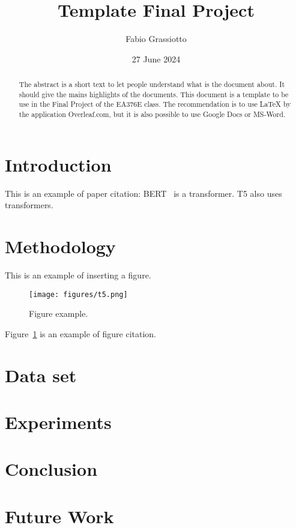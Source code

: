 \documentclass{article}
\title{Template Final Project}
\author{Fabio Grassiotto}
\date{27 June 2024}
\begin{document}
\maketitle

\begin{abstract}
    The abstract is a short text to let people understand what is the document about.
    It should give the mains highlights of the documents.
    This document is a template to be use in the Final Project of the EA376E class.
    The recommendation is to use LaTeX by the application Overleaf.com, but it is also
    possible to use Google Docs or MS-Word.
\end{abstract}

\section{Introduction}

This is an example of paper citation: BERT~ is a transformer. T5 also uses transformers.

\cite{lee2023survey}
\cite{kocmi2023large}
\cite{choi2022curious}
\cite{krause2023commonsense}
\cite{sap2019socialiqa}
\cite{zellers2019recognition}

\section{Methodology} 

This is an example of inserting a figure. 

\begin{figure}[ht]
\centering
\texttt{[image: figures/t5.png]}
\caption{\label{fig:t5}Figure example.}
\end{figure}

Figure~\ref{fig:t5} is an example of figure citation.

\section{Data set}

\section{Experiments}

\section{Conclusion}

\section{Future Work}



\end{document}
